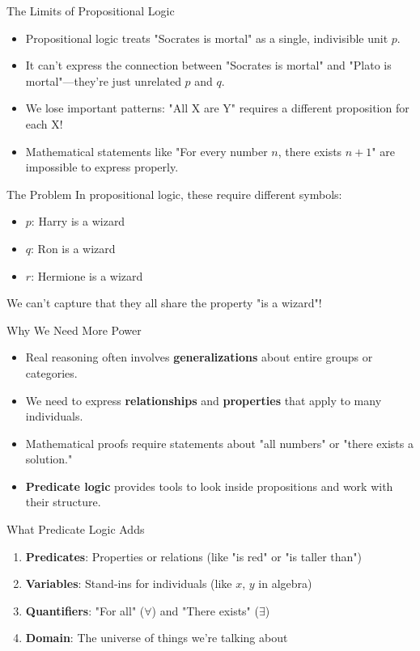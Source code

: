 \documentclass{beamer}
\begin{document}
	\begin{frame}{The Limits of Propositional Logic}
		\begin{itemize}
			\item Propositional logic treats "Socrates is mortal" as a single, indivisible unit $p$.
			\item It can't express the connection between "Socrates is mortal" and "Plato is mortal"—they're just unrelated $p$ and $q$.
			\item We lose important patterns: "All X are Y" requires a different proposition for each X!
			\item Mathematical statements like "For every number $n$, there exists $n+1$" are impossible to express properly.
		\end{itemize}
		
		\begin{alertblock}{The Problem}
			In propositional logic, these require different symbols:
			\begin{itemize}
				\item $p$: Harry is a wizard
				\item $q$: Ron is a wizard  
				\item $r$: Hermione is a wizard
			\end{itemize}
			We can't capture that they all share the property "is a wizard"!
		\end{alertblock}
	\end{frame}
	
	\begin{frame}{Why We Need More Power}
		\begin{itemize}
			\item Real reasoning often involves \textbf{generalizations} about entire groups or categories.
			\item We need to express \textbf{relationships} and \textbf{properties} that apply to many individuals.
			\item Mathematical proofs require statements about "all numbers" or "there exists a solution."
			\item \textbf{Predicate logic} provides tools to look inside propositions and work with their structure.
		\end{itemize}
		
		\begin{block}{What Predicate Logic Adds}
			\begin{enumerate}
				\item \textbf{Predicates}: Properties or relations (like "is red" or "is taller than")
				\item \textbf{Variables}: Stand-ins for individuals (like $x$, $y$ in algebra)
				\item \textbf{Quantifiers}: "For all" ($\forall$) and "There exists" ($\exists$)
				\item \textbf{Domain}: The universe of things we're talking about
			\end{enumerate}
		\end{block}
	\end{frame}
	
\end{document}
